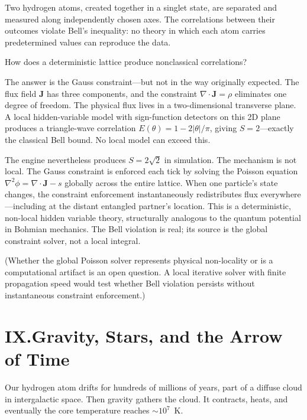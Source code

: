 \documentclass[11pt,a4paper]{article}
\begin{document}
Two hydrogen atoms, created together in a singlet state, are separated and measured along independently chosen axes. The correlations between their outcomes violate Bell's inequality: no theory in which each atom carries predetermined values can reproduce the data.

How does a deterministic lattice produce nonclassical correlations?

The answer is the Gauss constraint---but not in the way originally expected. The flux field $\mathbf{J}$ has three components, and the constraint $\nabla \cdot \mathbf{J} = \rho$ eliminates one degree of freedom. The physical flux lives in a two-dimensional transverse plane. A local hidden-variable model with sign-function detectors on this 2D plane produces a triangle-wave correlation $E(\theta) = 1 - 2|\theta|/\pi$, giving $S = 2$---exactly the classical Bell bound. No local model can exceed this.

The engine nevertheless produces $S = 2\sqrt{2}$ in simulation. The mechanism is not local. The Gauss constraint is enforced each tick by solving the Poisson equation $\nabla^2\phi = \nabla \cdot \mathbf{J} - s$ globally across the entire lattice. When one particle's state changes, the constraint enforcement instantaneously redistributes flux everywhere---including at the distant entangled partner's location. This is a deterministic, non-local hidden variable theory, structurally analogous to the quantum potential in Bohmian mechanics. The Bell violation is real; its source is the global constraint solver, not a local integral.

(Whether the global Poisson solver represents physical non-locality or is a computational artifact is an open question. A local iterative solver with finite propagation speed would test whether Bell violation persists without instantaneous constraint enforcement.)

\section*{IX.\quad Gravity, Stars, and the Arrow of Time}

Our hydrogen atom drifts for hundreds of millions of years, part of a diffuse cloud in intergalactic space. Then gravity gathers the cloud. It contracts, heats, and eventually the core temperature reaches $\sim 10^7$~K.
\end{document}
